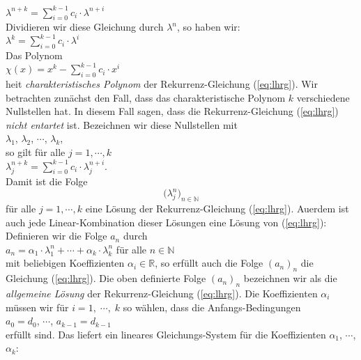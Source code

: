 $\lambda^{n+k} = \sum\limits_{i=0}^{k-1} c_i \cdot \lambda^{n+i}$
\\[0.2cm]
Dividieren wir diese Gleichung durch $\lambda^n$, so haben wir: \\[0.2cm]
\hspace*{1.3cm} $\lambda^{k} = \sum\limits_{i=0}^{k-1} c_i \cdot \lambda^{i}$  
\\[0.2cm]
Das Polynom \\[0.2cm]
\hspace*{1.3cm} 
$\chi(x) = x^{k} - \sum\limits_{i=0}^{k-1} c_i \cdot x^{i}$  
\\[0.2cm]
 hei\3t \emph{charakteristisches Polynom} der Rekurrenz-Gleichung (\ref{eq:lhrg}).
Wir betrachten zun\"{a}chst den Fall, dass das charakteristische  Polynom  $k$  verschiedene
Nullstellen hat.  In diesem Fall sagen, dass die Rekurrenz-Gleichung (\ref{eq:lhrg}) 
\emph{nicht entartet} ist.
Bezeichnen wir diese Nullstellen mit \\[0.2cm]
\hspace*{1.3cm}  $\lambda_1$, $\lambda_2$, $\cdots$, $\lambda_k$, \\[0.2cm]
so  gilt f\"{u}r alle $j = 1,\cdots, k$ \\[0.2cm]
\hspace*{1.3cm} 
$\lambda_j^{n+k} = \sum\limits_{i=0}^{k-1} c_i \cdot \lambda_j^{n+i}$.
\\[0.2cm]
Damit ist die Folge  
\[\bigl(\lambda_j^n)_{n\in\mathbb{N}}\]
f\"{u}r alle $j=1,\cdots,k$ eine L\"{o}sung der Rekurrenz-Gleichung (\ref{eq:lhrg}).
Au\3erdem ist auch jede Linear-Kombination dieser L\"{o}sungen eine L\"{o}sung von (\ref{eq:lhrg}):
Definieren wir die Folge $a_n$ durch \\[0.2cm]
\hspace*{1.3cm} 
$a_n = \alpha_1 \cdot \lambda_1^n + \cdots + \alpha_k \cdot \lambda_k^n$ \quad f\"{u}r alle $n
\in \mathbb{N}$ 
\\[0.2cm]
mit beliebigen Koeffizienten $\alpha_i \in \mathbb{R}$, so erf\"{u}llt auch die Folge
$(a_n)_n$ die Gleichung (\ref{eq:lhrg}).  Die oben definierte Folge $(a_n)_n$ bezeichnen wir als
die  \emph{allgemeine L\"{o}sung} der Rekurrenz-Gleichung (\ref{eq:lhrg}). 
Die Koeffizienten $\alpha_i$ m\"{u}ssen wir f\"{u}r $i=1,\;\cdots,\;k$ so w\"{a}hlen, dass die
Anfangs-Bedingungen 
\\[0.2cm]
\hspace*{1.3cm}
$a_0 = d_0$, $\cdots$, $a_{k-1} = d_{k-1}$
\\[0.2cm]
erf\"{u}llt sind.  Das liefert ein lineares Gleichungs-System f\"{u}r die Koeffizienten $\alpha_1$, $\cdots$, $\alpha_k$:
